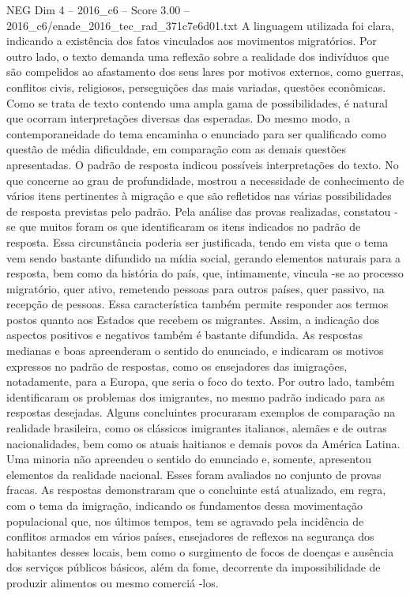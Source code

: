 \begin{textsample}{NEG Dim 4 – 2016\_c6 – Score 3.00 – 2016\_c6/enade\_2016\_tec\_rad\_371c7e6d01.txt}
A linguagem utilizada foi clara, indicando a existência dos fatos vinculados aos movimentos migratórios.
Por outro lado, o texto demanda uma reflexão sobre a realidade dos indivíduos que são compelidos ao afastamento dos seus lares por motivos externos, como guerras, conflitos civis, religiosos, perseguições das mais variadas, questões econômicas.
Como se trata de texto contendo uma ampla gama de possibilidades, é natural que ocorram interpretações diversas das esperadas.
Do mesmo modo, a contemporaneidade do tema encaminha o enunciado para ser qualificado como questão de média dificuldade, em comparação com as demais questões apresentadas.
O padrão de resposta indicou possíveis interpretações do texto.
No que concerne ao grau de profundidade, mostrou a necessidade de conhecimento de vários itens pertinentes à migração e que são refletidos nas várias possibilidades de resposta previstas pelo padrão.
Pela análise das provas realizadas, constatou -se que muitos foram os que identificaram os itens indicados no padrão de resposta.
Essa circunstância poderia ser justificada, tendo em vista que o tema vem sendo bastante difundido na mídia social, gerando elementos naturais para a resposta, bem como da história do país, que, intimamente, vincula -se ao processo migratório, quer ativo, remetendo pessoas para outros países, quer passivo, na recepção de pessoas.
Essa característica também permite responder aos termos postos quanto aos Estados que recebem os migrantes.
Assim, a indicação dos aspectos positivos e negativos também é bastante difundida.
As respostas medianas e boas apreenderam o sentido do enunciado, e indicaram os motivos expressos no padrão de respostas, como os ensejadores das imigrações, notadamente, para a Europa, que seria o foco do texto.
Por outro lado, também identificaram os problemas dos imigrantes, no mesmo padrão indicado para as respostas desejadas.
Alguns concluintes procuraram exemplos de comparação na realidade brasileira, como os clássicos imigrantes italianos, alemães e de outras nacionalidades, bem como os atuais haitianos e demais povos da América Latina.
Uma minoria não apreendeu o sentido do enunciado e, somente, apresentou elementos da realidade nacional.
Esses foram avaliados no conjunto de provas fracas.
As respostas demonstraram que o concluinte está atualizado, em regra, com o tema da imigração, indicando os fundamentos dessa movimentação populacional que, nos últimos tempos, tem se agravado pela incidência de conflitos armados em vários países, ensejadores de reflexos na segurança dos habitantes desses locais, bem como o surgimento de focos de doenças e ausência dos serviços públicos básicos, além da fome, decorrente da impossibilidade de produzir alimentos ou mesmo comerciá -los.

\end{textsample}
